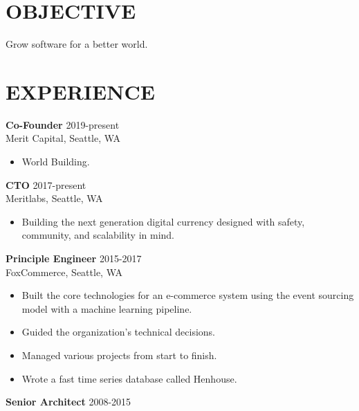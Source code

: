 \documentclass[line,margin]{res}
\begin{document}
\address{{\bf www.mempko.com}}
\address{{\bf max@mempko.com}}

\begin{resume}
 
\section{OBJECTIVE}       
                Grow software for a better world.
 
\section{EXPERIENCE} 
                {\bf Co-Founder} \hfill 2019-present \\
                Merit Capital, 
                Seattle, WA
                 \begin{itemize}  \itemsep -1pt %
                    \item World Building.
                 \end{itemize}
                {\bf CTO} \hfill 2017-present \\
                Meritlabs, 
                Seattle, WA
                 \begin{itemize}  \itemsep -1pt %
                    \item Building the next generation digital currency designed
                        with safety, community, and scalability in mind.
                 \end{itemize}
                {\bf Principle Engineer} \hfill 2015-2017 \\
                FoxCommerce, 
                Seattle, WA
                 \begin{itemize}  \itemsep -1pt %
                    \item Built the core technologies for an e-commerce system 
                        using the event sourcing model with a machine learning pipeline.
                    \item Guided the organization's technical decisions.
                    \item Managed various projects from start to finish.
                    \item Wrote a fast time series database called Henhouse.
                 \end{itemize}
                {\bf Senior Architect} \hfill 2008-2015 \\

\end{resume}
\end{document}
